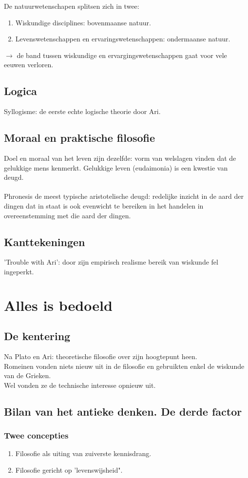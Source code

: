 De natuurwetenschapen splitsen zich in twee:
\begin{enumerate}
\item Wiskundige disciplines: bovenmaanse natuur.
\item Levenswetenschappen en ervaringswetenschappen: ondermaanse natuur.
\end{enumerate}
$\rightarrow$ de band tussen wiskundige en ervargingswetenschappen gaat voor vele eeuwen verloren.
\subsection{Logica}
Syllogisme: de eerste echte logische theorie door Ari.
\subsection{Moraal en praktische filosofie}
Doel en moraal van het leven zijn dezelfde: vorm van welslagen vinden dat de gelukkige mens kenmerkt. Gelukkige leven (eudaimonia) is een kwestie van deugd.
\\
\\
Phronesis de meest typische aristotelische deugd: redelijke inzicht in de aard der dingen dat in staat is ook evenwicht te bereiken in het handelen in overeenstemming met die aard der dingen.
\subsection{Kanttekeningen}
'Trouble with Ari': door zijn empirisch realisme bereik van wiskunde fel ingeperkt.
\section{Alles is bedoeld}
\subsection{De kentering}
Na Plato en Ari: theoretische filosofie over zijn hoogtepunt heen.
\\
Romeinen vonden niets nieuw uit in de filosofie en gebruikten enkel de wiskunde van de Grieken. 
\\
Wel vonden ze de technische interesse opnieuw uit.
\subsection{Bilan van het antieke denken. De derde factor}
\subsubsection{Twee concepties}
\begin{enumerate}
\item Filosofie als uiting van zuiverste kennisdrang.
\item Filosofie gericht op 'levenswijsheid".
\end{enumerate}
